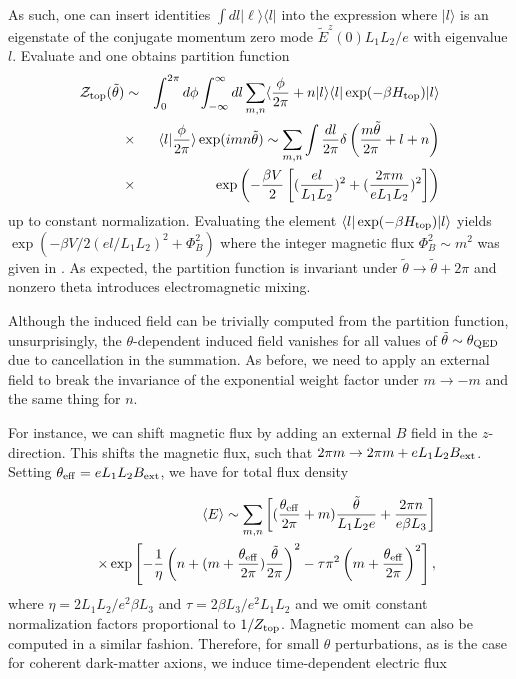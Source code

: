 \documentclass[ twocolumn,aps,prd,   
               preprintnumbers,numbers,sort&compress,nofootinbib,
                            showpacs,superscriptaddress,
               colorlinks,
               linkcolor=blue,   
               citecolor=blue]{revtex4-1}   \newcommand{\exclude}[1]{}
\newcommand{\be}{\begin{eqnarray}}
\newcommand{\ee}{\end{eqnarray}}
\begin{document}
As such, one can insert identities $\int dl |\ell\rangle\langle l|$ into the expression where $|l\rangle$ is an eigenstate of the conjugate momentum zero mode $\tilde{E}^z(0)L_1L_2/e$ with eigenvalue $l$. 
Evaluate and one obtains partition function  \cite{Chen-Lee:2010}
\be
\cal{Z}_{\rm top}(\tilde{\theta})&\sim& \int^{2\pi}_{0}d\phi\int_{-\infty}^{\infty}dl\sum_{m,n}\langle \frac{\phi}{2\pi}+n|l\rangle\langle l|\exp(-\beta H_{\rm top})|l\rangle  \nonumber \\
&\times &\langle l |\frac{\phi}{2\pi}\rangle\exp(i mn\tilde{\theta}) 
\sim\sum_{m,n} \int \frac{dl}{2\pi}\delta \left(\frac{m\tilde{\theta}}{2\pi}+l+n\right) \nonumber \\
&\times& \exp\left(-\frac{\beta V}{2}\left[(\frac{el}{L_1L_2})^2+(\frac{2\pi m}{eL_1L_2})^2\right]\right)
\ee
up to constant normalization. Evaluating the element $\langle l|\exp(-\beta H_{\rm top})|l\rangle$ yields $\exp(-\beta V/2 (el/L_1L_2)^2+\Phi_B^2)$ where the integer magnetic flux $\Phi_B^2\sim m^2$ was given in \cite{Cao:2013na}. As expected, the partition function is invariant under $\tilde{\theta}\rightarrow \tilde{\theta}+2\pi$ and nonzero theta introduces electromagnetic mixing.

Although the induced field can be trivially computed from the partition function, unsurprisingly, the $\theta$-dependent induced field vanishes for all values of $\tilde{\theta}\sim\theta_{\rm QED}$ due to cancellation in the summation.
As before, we need to apply an external field to break the invariance of the exponential weight factor under $m\rightarrow -m$ and the same thing for $n$.  



For instance, we can shift magnetic flux by adding an external $B$ field in the $z$-direction. This shifts the magnetic flux, such that $2\pi m\rightarrow 2\pi m+eL_1L_2 B_{\rm ext}$. Setting $\theta_{\rm eff}=eL_1L_2B_{\rm ext}$, we have for total flux density

\be
\label{E_Hamiltonian}
&&\langle E\rangle \sim \sum_{m,n} \left[(\frac{\theta_{\rm eff}}{2\pi}+m)\frac{\tilde{\theta}}{L_1L_2e}+\frac{2\pi n}{e\beta L_3}\right]\\
&&\times\exp\left[-\frac{1}{\eta}\left(n+(m+\frac{\theta_{\rm eff}}{2\pi})\frac{\tilde{\theta}}{2\pi}\right)^2-\tau\pi^2\left(m+\frac{\theta_{\rm eff}}{2\pi}\right)^2\right],\nonumber
\ee
where $\eta=2L_1L_2/e^2\beta L_3$ and $\tau = 2\beta L_3/e^2L_1L_2$ and  we omit constant normalization factors proportional to $1/Z_{\rm top}$. Magnetic moment can also be computed in a similar fashion. Therefore, for small $\theta$ perturbations, as is the case for coherent dark-matter axions, we induce time-dependent electric flux
\end{document}
